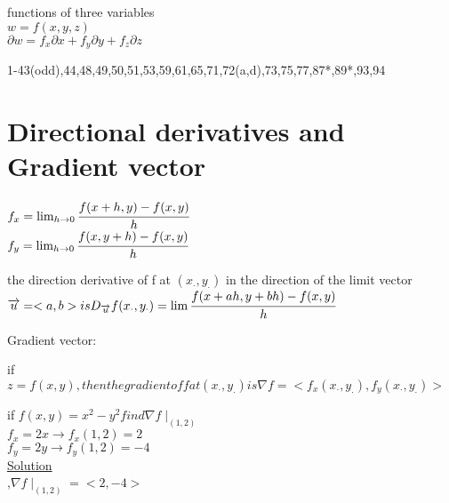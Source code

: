 \noindent{\color{smalt(darkpowderblue)}\rule{\linewidth}{.2mm}}
functions of three variables\\
$w = f (x,y,z) $\\
$\partial w = f_x \partial x + f_y \partial y + f_z \partial z $\\
\noindent{\color{smalt(darkpowderblue)}\rule{\linewidth}{.2mm}}
\begin{problem}
1-43(odd),44,48,49,50,51,53,59,61,65,71,72(a,d),73,75,77,87*,89*,93,94
\end{problem}
\section{Directional derivatives and Gradient vector}
$f_x=\lim_{h\to0} \cfrac{f(x+h,y)-f(x,y) }{h}$\\
$f_y = \lim_{h \to 0} \cfrac{f(x,y+h) - f(x,y)}{h}$\\
\noindent{\color{smalt(darkpowderblue)}\rule{\linewidth}{.2mm}}

\begin{definition}
the direction derivative of f at $(x_\cdot , y_\cdot)$ in the direction of the limit vector ${\overrightarrow{u}} = <a,b> is D_{\overrightarrow{u}} f(x_\cdot,y_\cdot)=\lim\cfrac{f(x+a h,y+b h) - f(x,y)}{h}$
\end{definition} 

Gradient vector:\\
\begin{definition}
if $z = f(x,y) , then the gradient of f at (x_\cdot,y_\cdot) is \nabla f = < f_x (x_\cdot ,y_\cdot),f_y(x_\cdot , y_\cdot)>$
\end{definition}
\noindent{\color{smalt(darkpowderblue)}\rule{\linewidth}{.2mm}}
\begin{example}
if $ f(x,y) = x^{2} - y^{2} find \nabla f\mid_(1,2)$\\
$f_x = 2x \rightarrow f_x(1,2) = 2 $\\
$f_y = 2y \rightarrow f_y(1,2) = -4$\\
\underline{\textbf{\large}\color{smalt(darkpowderblue)}Solution}\\,$\nabla f\mid_(1,2) = <2,-4>$
\end{example}

